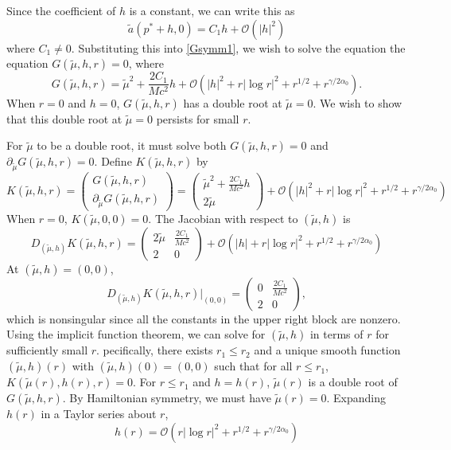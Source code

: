 \documentclass[thesis.tex]{subfiles}
\begin{document}
Since the coefficient of $h$ is a constant, we can write this as
\[
\tilde{a}(p^* + h, 0) = C_1 h + \mathcal{O}(|h|^2) 
\]
where $C_1 \neq 0$. Substituting this into \cref{Gsymm1}, we wish to solve the equation the equation $G(\tilde{\mu}, h, r) = 0$, where
\begin{equation}\label{Gsymm1}
G(\tilde{\mu}, h, r) = \tilde{\mu}^2 + \frac{2C_1}{M c^2}h + \mathcal{O}\left( |h|^2 + r |\log r|^2 + r^{1/2} + r^{\gamma/2\alpha_0} \right).
\end{equation}
When $r = 0$ and $h = 0$, $G(\tilde{\mu}, h, r)$ has a double root at $\tilde{\mu} = 0$. We wish to show that this double root at $\tilde{\mu} = 0$ persists for small $r$.

For $\tilde{\mu}$ to be a double root, it must solve both $G(\tilde{\mu}, h, r) = 0$ and $\partial_{\tilde{\mu}} G(\tilde{\mu}, h, r) = 0$. Define $K(\tilde{\mu}, h, r)$ by
\begin{equation}
K(\tilde{\mu}, h, r) = 
\begin{pmatrix}G(\tilde{\mu}, h, r) \\ \partial_{\tilde{\mu}}G(\tilde{\mu}, h, r) \end{pmatrix} 
= \begin{pmatrix}
\tilde{\mu}^2 + \frac{2C_1}{M c^2}h \\
2 \tilde{\mu}
\end{pmatrix}
+ \mathcal{O}\left( |h|^2 + r |\log r|^2 + r^{1/2} + r^{\gamma/2\alpha_0} \right)
\end{equation}
When $r = 0$, $K(\tilde{\mu}, 0, 0) = 0$. The Jacobian with respect to $(\tilde{\mu}, h)$ is
\[
D_{(\tilde{\mu}, h)}K(\tilde{\mu}, h, r) = 
\begin{pmatrix}
2 \tilde{\mu} & \frac{2C_1}{M c^2} \\
2 & 0
\end{pmatrix}
+ \mathcal{O}\left( |h| + r |\log r|^2 + r^{1/2} + r^{\gamma/2\alpha_0} \right)
\]
At $(\tilde{\mu}, h) = (0,0)$, 
\[
D_{(\tilde{\mu}, h)}K(\tilde{\mu}, h, r)\Big|_{(0,0)} = 
\begin{pmatrix}
0 & \frac{2C_1}{M c^2} \\
2 & 0
\end{pmatrix},
\]
which is nonsingular since all the constants in the upper right block are nonzero. Using the implicit function theorem, we can solve for $(\tilde{\mu}, h)$ in terms of $r$ for sufficiently small $r$. pecifically, there exists $r_1 \leq r_2$ and a unique smooth function $(\tilde{\mu}, h)(r)$ with $(\tilde{\mu}, h)(0) = (0, 0)$ such that for all $r \leq r_1$, $K(\tilde{\mu}(r), h(r), r) = 0$. For $r \leq r_1$ and $h = h(r)$, $\tilde{\mu}(r)$ is a double root of $G(\tilde{\mu}, h, r)$. By Hamiltonian symmetry, we must have $\tilde{\mu}(r) = 0$. Expanding $h(r)$ in a Taylor series about $r$, 
\begin{equation*}
h(r) = \mathcal{O}\left( r |\log r|^2 + r^{1/2} + r^{\gamma/2\alpha_0} \right)
\end{equation*}
\end{document}
